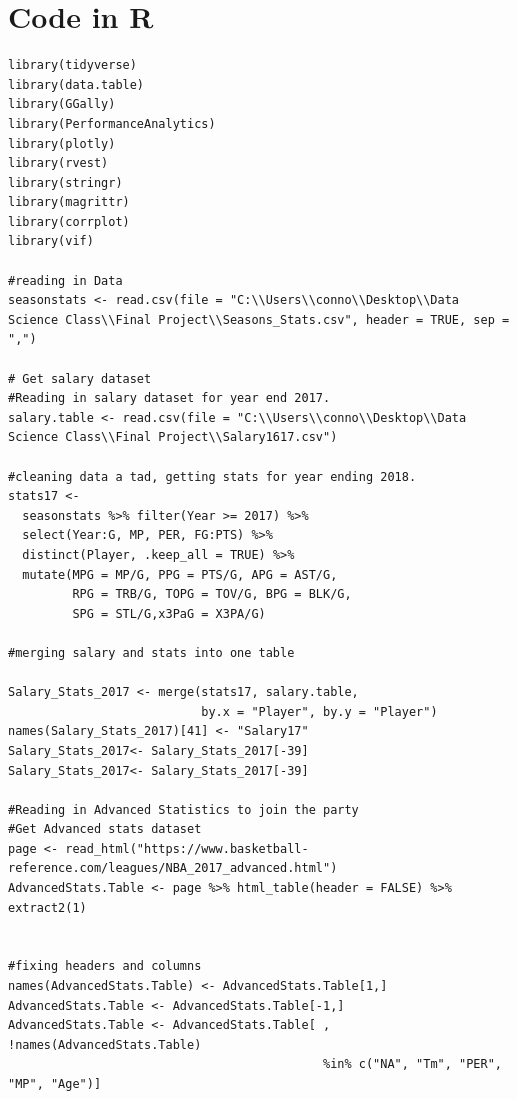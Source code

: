 \documentclass[12pt,english]{article}
\begin{document}
\section{Code in R}
\begin{singlespace}
\begin{lstlisting}
library(tidyverse)
library(data.table)
library(GGally)
library(PerformanceAnalytics)
library(plotly)
library(rvest)
library(stringr)
library(magrittr)
library(corrplot)
library(vif)

#reading in Data
seasonstats <- read.csv(file = "C:\\Users\\conno\\Desktop\\Data Science Class\\Final Project\\Seasons_Stats.csv", header = TRUE, sep = ",")

# Get salary dataset 
#Reading in salary dataset for year end 2017.
salary.table <- read.csv(file = "C:\\Users\\conno\\Desktop\\Data Science Class\\Final Project\\Salary1617.csv")

#cleaning data a tad, getting stats for year ending 2018.
stats17 <- 
  seasonstats %>% filter(Year >= 2017) %>% 
  select(Year:G, MP, PER, FG:PTS) %>% 
  distinct(Player, .keep_all = TRUE) %>% 
  mutate(MPG = MP/G, PPG = PTS/G, APG = AST/G, 
         RPG = TRB/G, TOPG = TOV/G, BPG = BLK/G, 
         SPG = STL/G,x3PaG = X3PA/G) 

#merging salary and stats into one table

Salary_Stats_2017 <- merge(stats17, salary.table,
                           by.x = "Player", by.y = "Player")
names(Salary_Stats_2017)[41] <- "Salary17"
Salary_Stats_2017<- Salary_Stats_2017[-39]
Salary_Stats_2017<- Salary_Stats_2017[-39]

#Reading in Advanced Statistics to join the party
#Get Advanced stats dataset
page <- read_html("https://www.basketball-reference.com/leagues/NBA_2017_advanced.html")
AdvancedStats.Table <- page %>% html_table(header = FALSE) %>% extract2(1)


#fixing headers and columns
names(AdvancedStats.Table) <- AdvancedStats.Table[1,]
AdvancedStats.Table <- AdvancedStats.Table[-1,]
AdvancedStats.Table <- AdvancedStats.Table[ , !names(AdvancedStats.Table) 
                                            %in% c("NA", "Tm", "PER", "MP", "Age")]


\end{lstlisting}
\end{singlespace}
\end{document}
